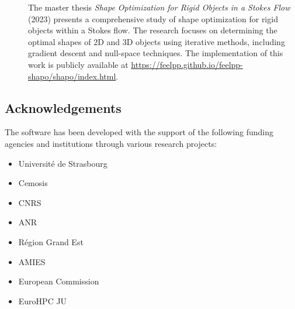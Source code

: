 \begin{description}
        \item[] The master thesis \emph{Shape Optimization for Rigid Objects in a Stokes Flow} (2023) presents a comprehensive study of shape optimization for rigid objects within a Stokes flow. The research focuses on determining the optimal shapes of 2D and 3D objects using iterative methods, including gradient descent and null-space techniques. The implementation of this work is publicly available at \url{https://feelpp.github.io/feelpp-shapo/shapo/index.html}.
\end{description}

\subsection{Acknowledgements}
\label{sec::Feelpp:acknowledgements}
The software has been developed with the support of the following funding agencies and institutions through various research projects:
\begin{itemize}
   \item Université de Strasbourg
   \item Cemosis
   \item CNRS
   \item ANR
   \item Région Grand Est
   \item AMIES
   \item European Commission
   \item EuroHPC JU
\end{itemize}
